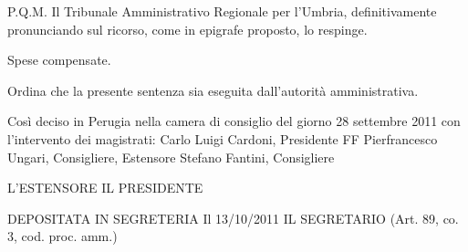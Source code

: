 P.Q.M.
Il Tribunale Amministrativo Regionale per l’Umbria, definitivamente pronunciando sul ricorso, come in epigrafe proposto, lo respinge.

Spese compensate.

Ordina che la presente sentenza sia eseguita dall’autorità amministrativa.

Così deciso in Perugia nella camera di consiglio del giorno 28 settembre 2011 con l’intervento dei magistrati:
Carlo Luigi Cardoni, Presidente FF
Pierfrancesco Ungari, Consigliere, Estensore
Stefano Fantini, Consigliere

L’ESTENSORE			IL PRESIDENTE

DEPOSITATA IN SEGRETERIA
Il 13/10/2011
IL SEGRETARIO
(Art. 89, co. 3, cod. proc. amm.)
